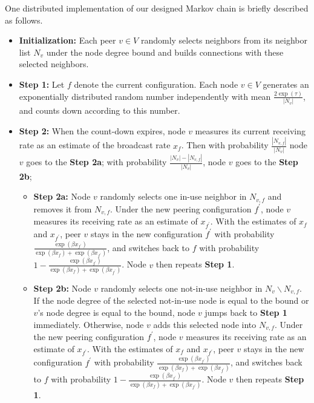 \documentclass[10pt,conference]{IEEEtran}
\begin{document}
One distributed implementation of our designed Markov chain is briefly
described as follows.
\begin{itemize}
\item \textbf{Initialization:} Each peer $v\in V$ randomly selects
neighbors from its neighbor list $N_{v}$ under the node degree bound and builds connections with these selected neighbors.
\item \textbf{Step 1:} Let $f$ denote the current configuration. Each node
$v\in V$ generates an exponentially distributed random number independently
with mean $\frac{2\exp(\tau)}{|N_{v}|}$,
and counts down according to this number.
\item \textbf{Step 2:} When the count-down expires, node $v$ measures its
current receiving rate as an estimate of the broadcast rate $x_{f}$.
Then with probability $\frac{|N_{v,f}|}{|N_{v}|}$ node $v$ goes to the \textbf{Step 2a};
with probability $\frac{|N_{v}|-|N_{v,f}|}{|N_{v}|}$, node $v$ goes to the \textbf{Step 2b};
    \begin{itemize}
        \item \textbf{Step 2a:} Node $v$ randomly selects one in-use neighbor
        in $N_{v,f}$ and removes it from $N_{v,f}$. Under the new peering
        configuration $f^{'}$, node $v$ measures its receiving rate as an estimate of
        $x_{f^{'}}$. With the estimates of $x_{f}$ and $x_{f^{'}}$, peer $v$ stays in the
        new configuration $f^{'}$ with probability $\frac{\exp(\beta x_{f^{'}})}{\exp(\beta x_{f})+\exp(\beta x_{f^{'}})}$, and switches back to $f$ with probability $1-\frac{\exp(\beta x_{f^{'}})}{\exp(\beta x_{f})+\exp(\beta x_{f^{'}})}$. Node $v$ then repeats \textbf{Step 1}.
        \item \textbf{Step 2b:} Node $v$ randomly selects one not-in-use neighbor
        in $N_{v}\backslash N_{v,f}$. If the node degree of the selected not-in-use node is equal to
        the bound or $v$'s node degree is equal to the bound, node $v$ jumps back to
        \textbf{Step 1} immediately. Otherwise,
        node $v$ adds this selected node into $N_{v,f}$. Under the new peering
        configuration $f^{'}$, node $v$ measures its receiving rate as an estimate of
        $x_{f^{'}}$. With the estimates of $x_{f}$ and $x_{f^{'}}$, peer $v$ stays in the
        new configuration $f^{'}$ with probability $\frac{\exp(\beta x_{f^{'}})}{\exp(\beta x_{f})+\exp(\beta x_{f^{'}})}$, and switches back to $f$ with probability $1-\frac{\exp(\beta x_{f^{'}})}{\exp(\beta x_{f})+\exp(\beta x_{f^{'}})}$. Node $v$ then repeats \textbf{Step 1}.
    \end{itemize}
\end{itemize}
\end{document}
